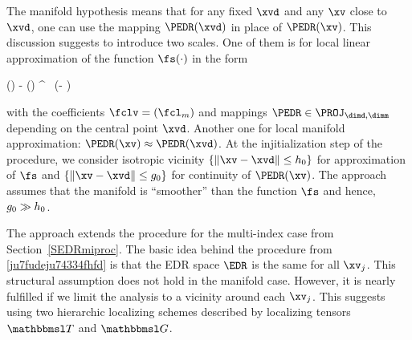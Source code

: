 The manifold hypothesis means that for any fixed \( \xvd \) and any \( \xv \) close to \( \xvd \), 
one can use the mapping \( \PEDR(\xvd) \) in place of \( \PEDR(\xv) \). 
%
This discussion suggests to introduce two scales.
One of them is for local linear approximation of the function \( \fs(\cdot) \) in the form
\begin{EQA}[c]
	\fs(\xv) - \fs(\xvd)
	\approx
	\fclv^{\T} \, \PEDR (\xv - \xvd) 
\end{EQA} 
with the coefficients \( \fclv = (\fcl_{m}) \) and mappings \( \PEDR \in \PROJ_{\dimd,\dimm} \) depending
on the central point \( \xvd \).
Another one for local manifold approximation:  
\(
	\PEDR(\xv)
	\approx
	\PEDR(\xvd)
\).
At the injitialization step of the procedure, we consider isotropic vicinity
\( \{ \| \xv - \xvd \| \leq \hiso_{0} \} \) for approximation of \( \fs \)
and \( \{ \| \xv - \xvd \| \leq \hisom_{0} \} \) for continuity of \( \PEDR(\xv) \).
The approach assumes that the manifold is ``smoother'' than the function \( \fs \) and hence,
\( g_{0} \gg h_{0} \).

The approach extends the procedure for the multi-index case from Section~\ref{SEDRmiproc}.
The basic idea behind the procedure from \eqref{ju7fudeju74334fhfd} is that the EDR space \( \EDR \)
is the same for all \( \xv_{j} \).
This structural assumption does not hold in the manifold case.
However, it is nearly fulfilled if we limit the analysis to a vicinity around each \( \xv_{j} \).
This suggests using two hierarchic localizing schemes described by 
localizing tensors \( \TEDR \) and \( \TEDRm \).

